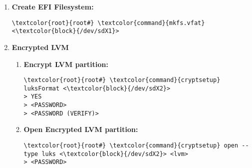 \documentclass[10pt, a4paper, onecolumn, openany]{book} %
\begin{document}
\begin{enumerate}
    \item \textbf{Create EFI Filesystem:}
\begin{Verbatim}[commandchars=\\\{\}]
\textcolor{root}{root#} \textcolor{command}{mkfs.vfat} <\textcolor{block}{/dev/sdX1}>
\end{Verbatim}

    \item \textbf{Encrypted LVM}
    \begin{enumerate}
        \item \textbf{Encrypt LVM partition:}
\begin{Verbatim}[commandchars=\\\{\}]
\textcolor{root}{root#} \textcolor{command}{cryptsetup} luksFormat <\textcolor{block}{/dev/sdX2}>
> YES
> <PASSWORD>
> <PASSWORD (VERIFY)>
\end{Verbatim}
        \item \textbf{Open Encrypted LVM partition:}
\begin{Verbatim}[commandchars=\\\{\}]
\textcolor{root}{root#} \textcolor{command}{cryptsetup} open --type luks <\textcolor{block}{/dev/sdX2}> <lvm>
> <PASSWORD>
\end{Verbatim}        
    \end{enumerate}


\end{enumerate}
\end{document}
